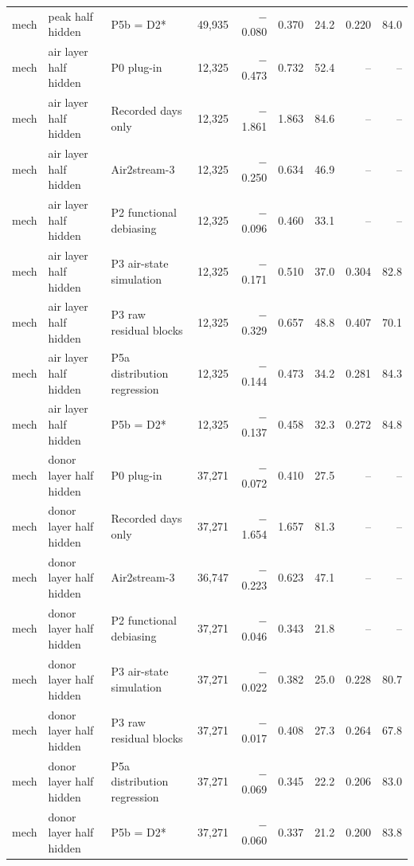\begin{table}
{\begin{tabular}{lllrrrrrr}
mech & peak half hidden & P5b = D2* & 49{,}935 & \ensuremath{-}0.080 & 0.370 & 24.2 & 0.220 & 84.0 \\
mech & air layer half hidden & P0 plug-in & 12{,}325 & \ensuremath{-}0.473 & 0.732 & 52.4 & -- & -- \\
mech & air layer half hidden & Recorded days only & 12{,}325 & \ensuremath{-}1.861 & 1.863 & 84.6 & -- & -- \\
mech & air layer half hidden & Air2stream-3 & 12{,}325 & \ensuremath{-}0.250 & 0.634 & 46.9 & -- & -- \\
mech & air layer half hidden & P2 functional debiasing & 12{,}325 & \ensuremath{-}0.096 & 0.460 & 33.1 & -- & -- \\
mech & air layer half hidden & P3 air-state simulation & 12{,}325 & \ensuremath{-}0.171 & 0.510 & 37.0 & 0.304 & 82.8 \\
mech & air layer half hidden & P3 raw residual blocks & 12{,}325 & \ensuremath{-}0.329 & 0.657 & 48.8 & 0.407 & 70.1 \\
mech & air layer half hidden & P5a distribution regression & 12{,}325 & \ensuremath{-}0.144 & 0.473 & 34.2 & 0.281 & 84.3 \\
mech & air layer half hidden & P5b = D2* & 12{,}325 & \ensuremath{-}0.137 & 0.458 & 32.3 & 0.272 & 84.8 \\
mech & donor layer half hidden & P0 plug-in & 37{,}271 & \ensuremath{-}0.072 & 0.410 & 27.5 & -- & -- \\
mech & donor layer half hidden & Recorded days only & 37{,}271 & \ensuremath{-}1.654 & 1.657 & 81.3 & -- & -- \\
mech & donor layer half hidden & Air2stream-3 & 36{,}747 & \ensuremath{-}0.223 & 0.623 & 47.1 & -- & -- \\
mech & donor layer half hidden & P2 functional debiasing & 37{,}271 & \ensuremath{-}0.046 & 0.343 & 21.8 & -- & -- \\
mech & donor layer half hidden & P3 air-state simulation & 37{,}271 & \ensuremath{-}0.022 & 0.382 & 25.0 & 0.228 & 80.7 \\
mech & donor layer half hidden & P3 raw residual blocks & 37{,}271 & \ensuremath{-}0.017 & 0.408 & 27.3 & 0.264 & 67.8 \\
mech & donor layer half hidden & P5a distribution regression & 37{,}271 & \ensuremath{-}0.069 & 0.345 & 22.2 & 0.206 & 83.0 \\
mech & donor layer half hidden & P5b = D2* & 37{,}271 & \ensuremath{-}0.060 & 0.337 & 21.2 & 0.200 & 83.8 \\

\end{tabular}}
\end{table}
